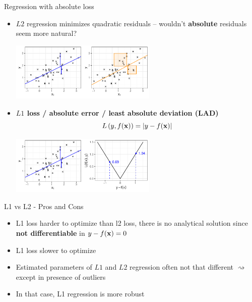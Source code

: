 \documentclass[11pt,compress,t,notes=noshow, xcolor=table]{beamer}
\begin{document}
\begin{vbframe}{Regression with absolute loss}

\begin{itemize}
    \item $L2$ regression minimizes quadratic residuals -- wouldn't 
    \textbf{absolute} residuals seem more natural? 
    \vspace{0.2cm}
    \begin{center}
    \includegraphics[width=0.55\textwidth]{figure/reg_l1_residual_abs_vs_quad}
    \end{center}
    \item \textbf{$L1$ loss / absolute error / least absolute deviation (LAD)}
    $$L\left(y, f(\mathbf{x})\right) = |y - f(\mathbf{x})|$$
    \begin{center}
    \includegraphics[width=0.55\textwidth]{figure/reg_l1_lossplot_abs}
    \end{center}
\end{itemize}

\end{vbframe}


\begin{vbframe}{L1 vs L2 - Pros and Cons}

\begin{itemize}
    \item L1 loss harder to optimize than l2 loss, there is no analytical solution since \textbf{not differentiable} in $y - f(\mathbf{x}) = 0$
    \item L1 loss slower to optimize
    \item Estimated parameters of $L1$ and $L2$ regression often not that different 
    $\rightsquigarrow$ except in presence of outliers 
    \item In that case, L1 regression is more robust  

\end{itemize}

\end{vbframe}
\end{document}
